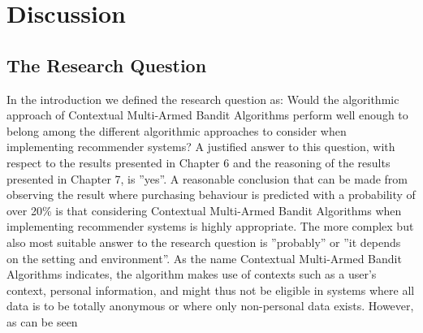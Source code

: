 \chapter{Discussion}

\section{The Research Question}

In the introduction we defined the research question as:
Would the algorithmic approach of Contextual Multi-Armed Bandit Algorithms perform
well enough to belong among the different algorithmic approaches to consider when implementing recommender systems?
A justified answer to this question, with respect to the results presented in Chapter 6 and
the reasoning of the results presented in Chapter 7, is ”yes”. A reasonable conclusion that
can be made from observing the result where purchasing behaviour is predicted with a
probability of over 20\% is that considering Contextual Multi-Armed Bandit Algorithms
when implementing recommender systems is highly appropriate.
The more complex but also most suitable answer to the research question is ”probably”
or ”it depends on the setting and environment”. As the name Contextual Multi-Armed
Bandit Algorithms indicates, the algorithm makes use of contexts such as a user’s context, personal information, and might thus not be eligible in systems where all data is to
be totally anonymous or where only non-personal data exists. However, as can be seen

